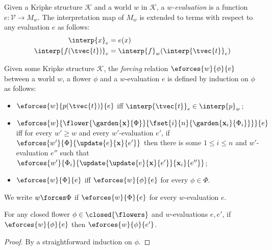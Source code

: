 \begin{definition}[$w$-evaluation]
  Given a Kripke structure $\mathcal{K}$ and a world $w$ in $\mathcal{K}$, a
  \emph{$w$-evaluation} is a function $e : \mathcal{V} \to M_w$.
  The interpretation map of $M_w$ is extended to terms with respect to any
  evaluation $e$ as follows:
  \begin{align*}
  \interp{x}_e &= e(x) \\
  \interp{f(\tvec{t})}_e &= \interp{f}_w(\interp{\tvec{t}}_e)
  \end{align*}
\end{definition}

\begin{definition}[Forcing]\label{def:forcing}

  Given some Kripke structure $\mathcal{K}$, the \emph{forcing} relation
  $\eforces{w}{\phi}{e}$ between a world $w$, a flower $\phi$ and a
  $w$-evaluation $e$ is defined by induction on $\phi$ as follows:
  \begin{itemize}
    \item $\eforces{w}{p(\tvec{t})}{e}$ iff $\interp{\tvec{t}}_e \in \interp{p}_w$;
    \item
    $\eforces{w}{\flower{\garden{\mathbf{x}}{\Phi}}{\fset{i}{n}{\garden{\mathbf{x}_i}{\Phi_i}}}}{e}$ iff for every $w' \geq
    w$ and every $w'$-evaluation $e'$, if
    $\eforces{w'}{\Phi}{\update{e}{\mathbf{x}}{e'}} $ then there is some $1
    \leq i \leq n$ and $w'$-evaluation $e''$ such that
    $\eforces{w'}{\Phi_i}{\update{\update{e}{\mathbf{x}}{e'}}{\mathbf{x}_i}{e''}}$;
    \item $\eforces{w}{\Phi}{e}$ iff $\eforces{w}{\phi}{e}$ for every $\phi \in
    \Phi$.
  \end{itemize}
  We write $w \forces \Phi$ if $\eforces{w}{\Phi}{e}$ for every $w$-evaluation
  $e$.
\end{definition}

\begin{lemma}\label{thm:closed-forcing}
  
  For any closed flower $\phi \in \closed{\flowers}$ and $w$-evaluations $e,
  e'$, if $\eforces{w}{\phi}{e}$ then $\eforces{w}{\phi}{e'}$.
\end{lemma}
\begin{proof}
  By a straightforward induction on $\phi$.
\end{proof}


